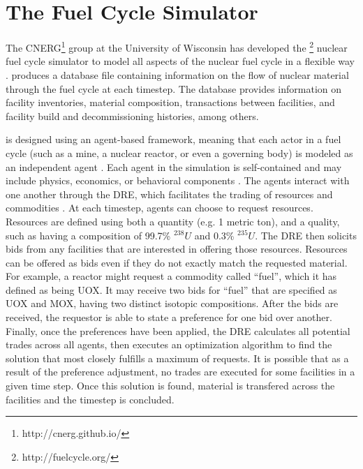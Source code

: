 \section{The \Cyclus Fuel Cycle Simulator}
\label{s_methods}

The \gls{CNERG}\footnote{http://cnerg.github.io/} group at the University of Wisconsin has developed the \Cyclus\footnote{http://fuelcycle.org/} nuclear fuel cycle simulator to model all aspects of the nuclear fuel cycle in a flexible way \cite{cyclus_v1_0,cyclus_v1_2,cyclus_v1_3}. \Cyclus produces a database file containing information on the flow of nuclear material through the fuel cycle at each timestep.  The database provides information on facility inventories, material composition, transactions between facilities, and facility build and decommissioning histories, among others.

\Cyclus is designed using an agent-based framework, meaning that each actor  in a fuel cycle (such as a mine, a nuclear reactor, or even a governing body) is modeled as an independent agent \cite{jennings_agent-based_2000, taylor2014agent}.  Each agent in the simulation is self-contained and may include physics, economics, or behavioral components \cite{huff_open_2011,gidden_agent-based_2013,gidden_agent-based_2015}.  The agents interact with one another through the \gls{DRE}, which facilitates the trading of resources and commodities \cite{gidden_agent-based_2014}.  At each timestep, agents can choose to request resources.  Resources are defined using both a quantity (e.g. 1 metric ton), and a quality, such as having a composition of 99.7\% $^{238}U$ and 0.3\% $^{235}U$.  The \gls{DRE} then solicits bids from any facilities that are interested in offering those resources. Resources can be offered as bids even if they do not exactly match the requested material. For example, a reactor might request a commodity called ``fuel'', which it has defined as being \gls{UOX}.  It may receive two bids for ``fuel'' that are specified as \gls{UOX} and \gls{MOX}, having two distinct isotopic compositions. After the bids are received, the requestor is able to state a preference for one bid over another. Finally, once the preferences have been applied, the \gls{DRE} calculates all potential trades across all agents, then executes an optimization algorithm to find the solution that most closely fulfills a maximum of requests. It is possible that as a result of the preference adjustment, no trades are executed for some facilities in a given time step.  Once this solution is found, material is transfered across the facilities and the timestep is concluded.

